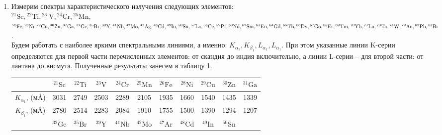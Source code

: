 \documentclass[a4paper, 12pt]{article}%
\begin{document}
	\begin{enumerate}
		
		\item Измерим спектры характеристического излучения следующих элементов: \\
		 ${ }^{21} \mathrm{Sc},{ }^{22} \mathrm{Ti},{ }^{23} \mathrm{~V},{ }^{24} \mathrm{Cr},{ }^{25} \mathrm{Mn}$, ${ }^{26} \mathrm{Fe},{ }^{28} \mathrm{Ni},{ }^{29} \mathrm{Cu}, { }^{30} \mathrm{Zn},{ }^{37} \mathrm{Ga},{ }^{32} \mathrm{Ge},{ }^{35} \mathrm{Br},{ }^{39} \mathrm{Y},{ }^{41} \mathrm{Nb},{ }^{42} \mathrm{Mo}, \\{ }^{47} \mathrm{Ag},{ }^{48} \mathrm{Cd},{ }^{49} \mathrm{In},{ }^{50} \mathrm{Sn},{ }^{57} \mathrm{La},{ }^{58} \mathrm{Ce},{ }^{59} \mathrm{Pr},{ }^{60} \mathrm{Nd},{ }^{62} \mathrm{Sm},{ }^{63} \mathrm{Eu},{ }^{64} \mathrm{Gd}, { }^{65} \mathrm{Tb},{ }^{66} \mathrm{Dy},{ }^{67} \mathrm{Go},{ }^{68} \mathrm{Er},\\{ }^{69} \mathrm{Tm},{ }^{70} \mathrm{Yb},{ }^{71} \mathrm{Lu},{ }^{73} \mathrm{Ta},{ }^{74} \mathrm{W},{ }^{79} \mathrm{Au},{ }^{82} \mathrm{Pb},{ }^{83} \mathrm{Bi}$ .\\
		 
		 
		 Будем работать с наиболее яркими спектральными линиями,
		 а именно: $K_{\alpha_1}, K_{\beta_1}, L_{\alpha_1}, L_{\alpha_1}$. При этом указанные линии K-серии определяются для первой части перечисленных элементов: от скандия до индия включительно, а линии L-серии – для второй
		 части: от лантана до висмута.
		 Полученные результаты занесем в таблицу 1.
		 
		 
		 	\begin{longtable}{|c|c|c|c|c|c|c|c|c|c|c|}
		 	\hline
  			& ${ }^{21} \mathrm{Sc}$ & ${ }^{22} \mathrm{Ti}$ & ${}^{23} \mathrm{V}$ & ${ }^{24} \mathrm{Cr}$ & ${ }^{25} \mathrm{Mn}$ & ${ }^{26} \mathrm{Fe}$ & ${ }^{28} \mathrm{Ni}$ & ${ }^{29} \mathrm{Cu}$ & ${ }^{30} \mathrm{Zn}$ & ${ }^{31} \mathrm{Ga}$ \\ \hline
		 	
		 	$K_{\alpha_1}$, (м\AA) & 3031 & 2749 & 2503 & 2289 & 2105 & 1935 & 1660 & 1540 & 1435 & 1339 \\ \hline
		 	$K_{\beta_1}$, (м\AA) & 2780 & 2514 & 2283 & 2084 & 1910 & 1755 & 1500 & 1390 & 1294 & 1207 \\ \hline
		 	\hline
	 		 & ${ }^{32} \mathrm{Ge}$ & ${}^{35} \mathrm{Br}$ & ${ }^{39} \mathrm{Y}$ & ${ }^{41} \mathrm{Nb}$ & ${ }^{42} \mathrm{Mo}$ & ${ }^{47} \mathrm{Ar}$ & ${ }^{48} \mathrm{Cd}$ & ${ }^{49} \mathrm{In}$ & ${ }^{50} \mathrm{Sn}$ & \\ \hline
		 	

\end{longtable}
\end{enumerate}
\end{document}
